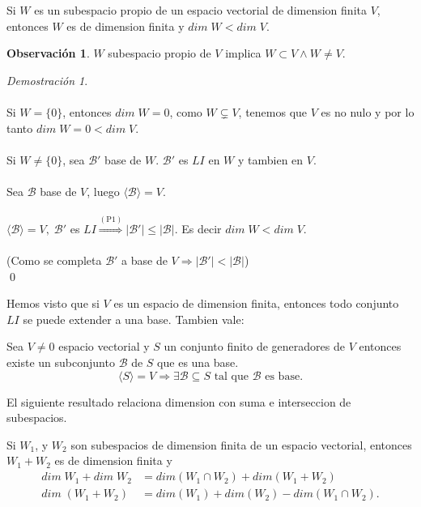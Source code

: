 \documentclass{article}
\theoremstyle{definition}
\theoremstyle{definition}
\newtheorem*{obs}{Observación}
\theoremstyle{remark}
\newtheorem*{demo}{Demostración}
\begin{document}
\begin{corol}
  Si $W$ es un subespacio propio de un espacio vectorial de dimension finita $V$, entonces $W$ es de dimension finita y $dim \; W < dim \; V$. 
\end{corol}
\begin{obs}
  $W$ subespacio propio de $V$ implica $W \subset V \land W \neq V$.
\end{obs}
\begin{demo}\;\\\\ 
  Si $W = \{0\}$, entonces $dim \; W=0$, como $W \subsetneq V$, tenemos que $V$ es no nulo y por lo tanto $dim \; W=0 <dim \; V$. \\\\ Si $W \neq \{0\}$, sea $\mathcal{B}'$ base de $W$. $\mathcal{B}'$ es $LI$ en $W$ y tambien en $V$. \\\\ Sea $\mathcal{B}$ base de $V$, luego $\langle \mathcal{B} \rangle =V$. \\\\ $\langle \mathcal{B} \rangle = V,\; \mathcal{B}'$ es $LI \overset{(\text{P1})}{\Rightarrow} |\mathcal{B}'| \leq |\mathcal{B}|$. Es decir $dim \; W < dim \; V$. \\\\ (Como se completa $\mathcal{B}'$ a base de $V \Rightarrow |\mathcal{B}'|<|\mathcal{B}|$) \\\qed

\end{demo}
Hemos visto que si $V$ es un espacio de dimension finita, entonces todo conjunto $LI$ se puede extender a una base. Tambien vale: \begin{teo}
  Sea $V \neq 0$ espacio vectorial y $S$ un conjunto finito de generadores de $V$ entonces existe un subconjunto $\mathcal{B}$ de $S$ que es una base. \[
    \langle S \rangle = V \Rightarrow \exists \mathcal{B} \subseteq S \text{ tal que } \mathcal{B} \text{ es base}.
  \]
\end{teo}
El siguiente resultado relaciona dimension con suma e interseccion de subespacios. 
\begin{teo}
  Si $W_1$, y $W_2$ son subespacios de dimension finita de un espacio vectorial, entonces $W_1+W_2$ es de dimension finita y \[\begin{aligned}
  dim \; W_1 + dim \; W_2 &= dim(W_1 \cap W_2 )+ dim(W_1+W_2) \\ dim\;(W_1+W_2)&=dim(W_1)+dim(W_2)-dim(W_1 \cap W_2).\end{aligned}
  \]
\end{teo} \pagebreak
\end{document}
